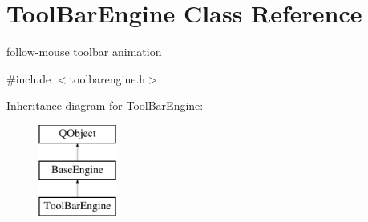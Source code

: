 \hypertarget{class_tool_bar_engine}{}\section{Tool\+Bar\+Engine Class Reference}
\label{class_tool_bar_engine}


follow-\/mouse toolbar animation  




{\ttfamily \#include $<$toolbarengine.\+h$>$}

Inheritance diagram for Tool\+Bar\+Engine\+:\begin{figure}[H]
\begin{center}
\leavevmode
\includegraphics[height=3.000000cm]{class_tool_bar_engine}
\end{center}
\end{figure}
